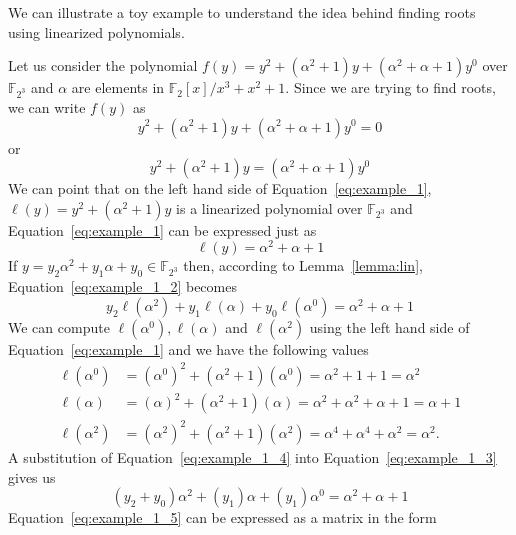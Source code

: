 We can illustrate a toy example to understand the idea behind finding roots using linearized polynomials.
\begin{example}\label{ex:1}
Let us consider the polynomial $f(y) = y^2 + (\alpha^2+1)y + (\alpha^2 +\alpha +1)y^0$ over $\mathbb{F}_{2^3}$ and $\alpha$ are elements in $\mathbb{F}_2[x]/ x^3+x^2+1$. Since we are trying to find roots, we can write $f(y)$ as
 $$ y^2 + (\alpha^2+1)y + (\alpha^2 +\alpha +1)y^0 = 0$$
 or
\begin{equation}\label{eq:example_1}
    y^2 + (\alpha^2+1)y   = (\alpha^2 +\alpha +1)y^0
\end{equation}
We can point that on the left hand side of Equation~\ref{eq:example_1}, $\ell(y) = y^2 + (\alpha^2+1)y$ is a linearized polynomial over $\mathbb{F}_{2^3}$ and Equation~\ref{eq:example_1} can be expressed just as
\begin{equation}\label{eq:example_1_2}
    \ell(y) = \alpha^2 +\alpha +1
\end{equation}
If $y = y_2\alpha^2 + y_1\alpha + y_0 \in \mathbb{F}_{2^3}$ then, according to Lemma~\ref{lemma:lin}, Equation~\ref{eq:example_1_2} becomes
\begin{equation}\label{eq:example_1_3}
    y_2\ell(\alpha^2) + y_1\ell(\alpha) + y_0\ell(\alpha^0) = \alpha^2 +\alpha +1
\end{equation}
We can compute $\ell(\alpha^0),\ell(\alpha)$ and $\ell(\alpha^2)$ using the left hand side of Equation~\ref{eq:example_1} and we have the following values
\begin{equation}\label{eq:example_1_4}
    \begin{split}
        \ell(\alpha^0) & = (\alpha^0)^2 + (\alpha^2+1)(\alpha^0) = \alpha^2+1 + 1 = \alpha^2 \\
        \ell(\alpha) & = (\alpha)^2 + (\alpha^2+1)(\alpha) = \alpha^2 + \alpha^2+ \alpha + 1 = \alpha + 1 \\
        \ell(\alpha^2) & = (\alpha^2)^2 + (\alpha^2+1)(\alpha^2) = \alpha^4 +\alpha^4 +  \alpha^2 = \alpha^2.
    \end{split}
\end{equation}
A substitution of Equation~\ref{eq:example_1_4} into Equation~\ref{eq:example_1_3} gives us
\begin{equation}\label{eq:example_1_5}
     (y_2+y_0)\alpha^2 + (y_1)\alpha + (y_1)\alpha^0 = \alpha^2 +\alpha +1
\end{equation}
Equation~\ref{eq:example_1_5} can be expressed as a matrix in the form
\begin{equation}\label{eq:example_1_6}

\end{equation}
\end{example}
